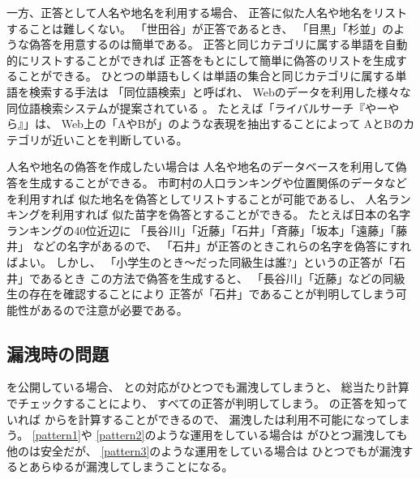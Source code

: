 \documentclass[twoside]{wiss}
\begin{document}
一方、正答として人名や地名を利用する場合、
正答に似た人名や地名をリストすることは難しくない。
「世田谷」が正答であるとき、
「目黒」「杉並」のような偽答を用意するのは簡単である。
%
正答と同じカテゴリに属する単語を自動的にリストすることができれば
正答をもとにして簡単に偽答のリストを生成することができる。
%
ひとつの単語もしくは単語の集合と同じカテゴリに属する単語を検索する手法は
「同位語検索」と呼ばれ、
Webのデータを利用した様々な同位語検索システムが提案されている%
\cite{Huang:2012:LFC:2426725.2426728}%
\cite{BooWa}%
\cite{Wang:2007:LSE:1441428.1442086}%
\cite{大島裕明:2006-12-15}%
。
たとえば「ライバルサーチ『やーやら』」\cite{大島裕明:2006-12-15}は、
Web上の「AやBが」のような表現を抽出することによって
AとBのカテゴリが近いことを判断している。

人名や地名の偽答を作成したい場合は
人名や地名のデータベースを利用して偽答を生成することができる。
市町村の人口ランキングや位置関係のデータなどを利用すれば
似た地名を偽答としてリストすることが可能であるし、
人名ランキングを利用すれば
似た苗字を偽答とすることができる。
たとえば日本の名字ランキングの40位近辺に
「長谷川」「近藤」「石井」「斉藤」「坂本」「遠藤」「藤井」
などの名字があるので、
「石井」が正答のときこれらの名字を偽答にすればよい。
しかし、
「小学生のとき〜だった同級生は誰?」という{\SQ}の正答が「石井」であるとき
この方法で偽答を生成すると、
「長谷川」「近藤」などの同級生の存在を確認することにより
正答が「石井」であることが判明してしまう可能性があるので注意が必要である。


%
\subsection{{\PW}漏洩時の問題}

{\SQ}を公開している場合、
{\SS}と{\PW}の対応がひとつでも漏洩してしまうと、
総当たり計算でチェックすることにより、
すべて{\SQ}の正答が判明してしまう。
{\SQ}の正答を知っていれば
{\SS}から{\PW}を計算することができるので、
漏洩した{\SQ}は利用不可能になってしまう。
%
\ref{pattern1}や
\ref{pattern2}のような運用をしている場合は
{\PW}がひとつ漏洩しても他の{\PW}は安全だが、
\ref{pattern3}のような運用をしている場合は
ひとつでも{\PW}が漏洩するとあらゆる{\PW}が漏洩してしまうことになる。
\end{document}
